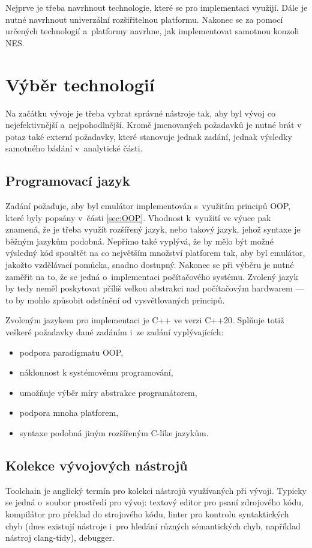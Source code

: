 Nejprve je třeba navrhnout technologie, které se pro implementaci využijí. Dále je nutné navrhnout univerzální rozšiřitelnou platformu. Nakonec se za pomocí určených technologií a~platformy navrhne, jak implementovat samotnou konzoli NES.

\section{Výběr technologií}
Na začátku vývoje je třeba vybrat správné nástroje tak, aby byl vývoj co nejefektivnější a~nejpohodlnější. Kromě jmenovaných požadavků je nutné brát v potaz také externí požadavky, které stanovuje jednak zadání, jednak výsledky samotného bádání v~analytické části.

\subsection{Programovací jazyk}
Zadání požaduje, aby byl emulátor implementován s~využitím principů OOP, které byly popsány v~části \ref{sec:OOP}. Vhodnost k~využití ve výuce pak znamená, že je třeba využít rozšířený jazyk, nebo takový jazyk, jehož syntaxe je běžným jazykům podobná. Nepřímo také vyplývá, že by mělo být možné výsledný kód spouštět na co největším množství platforem tak, aby byl emulátor, jakožto vzdělávací pomůcka, snadno dostupný. Nakonec se při výběru je nutné zaměřit na to, že se jedná o~implementaci počítačového systému. Zvolený jazyk by tedy neměl poskytovat příliš velkou abstrakci nad počítačovým hardwarem --- to by mohlo způsobit odstínění od vysvětlovaných principů.

Zvoleným jazykem pro implementaci je C++ ve verzi C++20. Splňuje totiž veškeré požadavky dané zadáním i~ze zadání vyplývajících:
\begin{itemize}
	\item podpora paradigmatu OOP,
	\item náklonnost k systémovému programování,
	\item umožňuje výběr míry abstrakce programátorem,
	\item podpora mnoha platforem,
	\item syntaxe podobná jiným rozšířeným C-like jazykům.
\end{itemize}

\subsection{Kolekce vývojových nástrojů}
\begin{definition}[Toolchain]
	Toolchain je anglický termín pro kolekci nástrojů využívaných při vývoji. Typicky se jedná o~soubor prostředí pro vývoj: textový editor pro psaní zdrojového kódu, kompilátor pro překlad do strojového kódu, linter pro kontrolu syntaktických chyb (dnes existují nástroje i~pro hledání různých sémantických chyb, například nástroj clang-tidy), debugger.
\end{definition}

